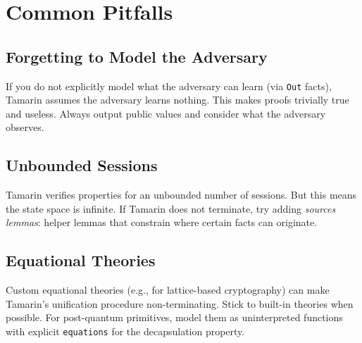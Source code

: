 \section{Common Pitfalls}


\subsection{Forgetting to Model the Adversary}

If you do not explicitly model what the adversary can learn (via \texttt{Out} facts),
Tamarin assumes the adversary learns nothing. This makes proofs trivially true and
useless. Always output public values and consider what the adversary observes.

\subsection{Unbounded Sessions}

Tamarin verifies properties for an unbounded number of sessions. But this means the
state space is infinite. If Tamarin does not terminate, try adding \emph{sources lemmas}:
helper lemmas that constrain where certain facts can originate.

\subsection{Equational Theories}

Custom equational theories (e.g., for lattice-based cryptography) can make Tamarin's
unification procedure non-terminating. Stick to built-in theories when possible. For
post-quantum primitives, model them as uninterpreted functions with explicit
\texttt{equations} for the decapsulation property.

